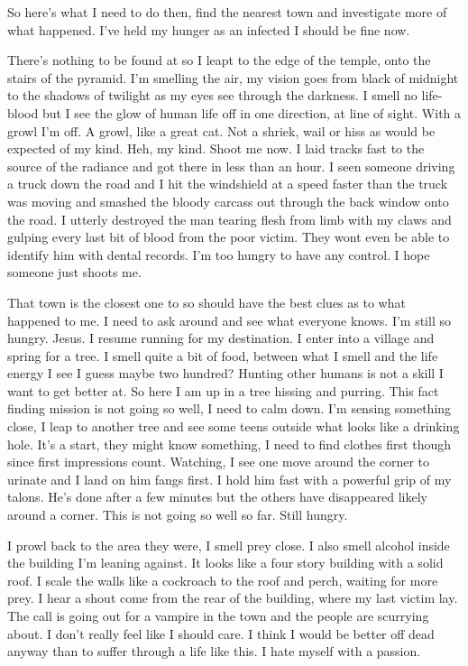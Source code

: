 So here's what I need to do then, find the nearest town and investigate more of what happened. I've held my hunger as an infected I should be fine now.

There's nothing to be found at \chichenitza so I leapt to the edge of the temple, onto the stairs of the pyramid. I'm smelling the air, my vision goes from black of midnight to the shadows of twilight as my eyes see through the darkness. I smell no life-blood but I see the glow of human life off in one direction, at line of sight. With a growl I'm off. A growl, like a great cat. Not a shriek, wail or hiss as would be expected of my kind. Heh, my kind. Shoot me now. I laid tracks fast to the source of the radiance and got there in less than an hour. I seen someone driving a truck down the road and I hit the windshield at a speed faster than the truck was moving and smashed the bloody carcass out through the back window onto the road. I utterly destroyed the man tearing flesh from limb with my claws and gulping every last bit of blood from the poor victim. They wont even be able to identify him with dental records. I'm too hungry to have any control. I hope someone just shoots me.

That town is the closest one to \chichenitza so should have the best clues as to what happened to me. I need to ask around and see what everyone knows. I'm still so  hungry. Jesus. I resume running for my destination. I enter into a village and spring for a tree. I smell quite a bit of food, between what I smell and the life energy I see I guess maybe two hundred? Hunting other humans is not a skill I want to get better at. So here I am up in a tree hissing and purring. This fact finding mission is not going so well, I need to calm down. I'm sensing something close, I leap to another tree and see some teens outside what looks like a drinking hole. It's a start, they might know something, I need to find clothes first though since first impressions count. Watching, I see one move around the corner to urinate and I land on him fangs first. I hold him fast with a powerful grip of my talons. He's done after a few minutes but the others have disappeared likely around a corner. This is not going so well so far. Still hungry. 

I prowl back to the area they were, I smell prey close. I also smell alcohol inside the building I'm leaning against. It looks like a four story building with a solid roof. I scale the walls like a cockroach to the roof and perch, waiting for more prey. I hear a shout come from the rear of the building, where my last victim lay. The call is going out for a vampire in the town and the people are scurrying about. I don't really feel like I should care. I think I would be better off dead anyway than to suffer through a life like this. I hate myself with a passion. 


